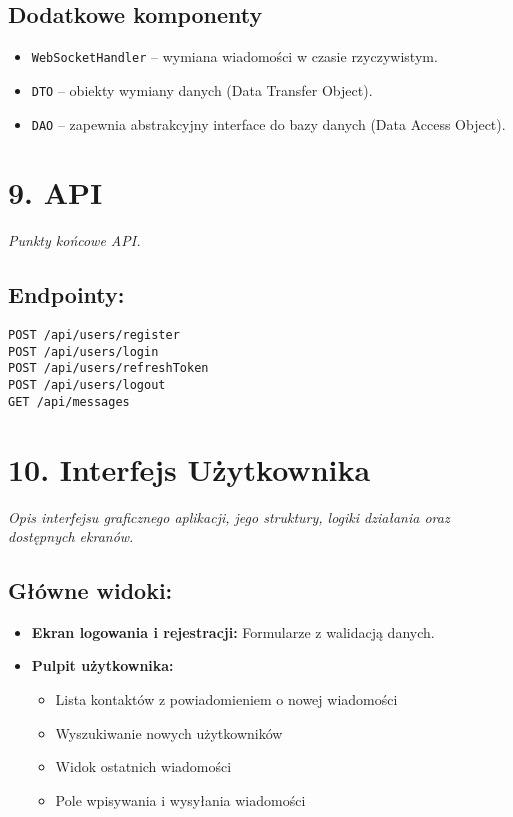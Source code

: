 \documentclass[a4paper,12pt]{article}
\begin{document}
\subsection*{Dodatkowe komponenty}
\begin{itemize}
    \item \texttt{WebSocketHandler} – wymiana wiadomości w czasie rzyczywistym.
    \item \texttt{DTO} – obiekty wymiany danych (Data Transfer Object).
    \item \texttt{DAO} – zapewnia abstrakcyjny interface do bazy danych (Data Access Object).
\end{itemize}

\section*{9. API}
\textit{Punkty końcowe API.}
\vspace{0.5 cm}
 \noindent
\subsection*{Endpointy:}
\begin{verbatim}
POST /api/users/register
POST /api/users/login
POST /api/users/refreshToken
POST /api/users/logout
GET /api/messages
\end{verbatim}

\section*{10. Interfejs Użytkownika}
\textit{Opis interfejsu graficznego aplikacji, jego struktury, logiki działania oraz dostępnych ekranów.}

\vspace{0.5 cm}
 \noindent
\subsection*{Główne widoki:}
\begin{itemize}
    \item \textbf{Ekran logowania i rejestracji:} Formularze z walidacją danych.
    \item \textbf{Pulpit użytkownika:}
    \begin{itemize}
        \item  Lista kontaktów z powiadomieniem o nowej wiadomości
        \item  Wyszukiwanie nowych użytkowników
        \item  Widok ostatnich wiadomości
        \item  Pole wpisywania i wysyłania wiadomości
    \end{itemize}
\end{itemize}
\end{document}
